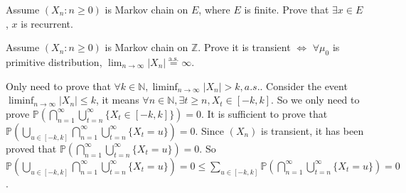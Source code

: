 \documentclass{ctexart}
\begin{document}
\begin{problem}\label{pro:3}
  Assume \((X_n: n \geq 0)\) is Markov chain on \(E\), where \(E\) is finite. Prove that \(\exists x \in E\), \(x\) is recurrent.
\end{problem}
\begin{solution}

\end{solution}

\begin{problem}\label{pro:4}
  Assume \((X_n:n \geq 0)\) is Markov chain on \(\mathbb{Z}\). Prove it is transient \(\iff\)
  \(\forall \mu_0\) is primitive distribution, \(\lim_{n \to \infty} |X_n| \overset{\text{a.s.}}{=} \infty\).
\end{problem}
\begin{solution}
  Only need to prove that \(\forall k \in \mathbb{N},\liminf_{n \to \infty}|X_n|>k,a. s.\).
  Consider the event \(\liminf_{n \to \infty}|X_n|\leq k\), it means \(\forall n \in \mathbb{N},\exists t \geq n,X_t \in [-k,k]\).
  So we only need to prove \(\mathbb{P}\left(\bigcap_{n=1}^{\infty} \bigcup_{t=n}^{\infty} \{X_t \in [-k,k]\}\right)=0\).
  It is sufficient to prove that \(\mathbb{P}(\bigcup_{u \in [-k,k]}\bigcap_{n=1}^{\infty} \bigcup_{t=n}^{\infty} \{X_t=u\})=0\).
  Since \((X_n)\) is transient, it has been proved that \(\mathbb{P}(\bigcap_{n=1}^{\infty} \bigcup_{t=n}^{\infty} \{X_t=u\})=0\).
  So \(\mathbb{P}(\bigcup_{u \in [-k,k]}\bigcap_{n=1}^{\infty} \bigcup_{t=n}^{\infty} \{X_t=u\})=0 \leq \sum_{u \in [-k,k]}\mathbb{P}(\bigcap_{n=1}^{\infty} \bigcup_{t=n}^{\infty} \{X_t=u\})=0\).
\end{solution}
\end{document}
